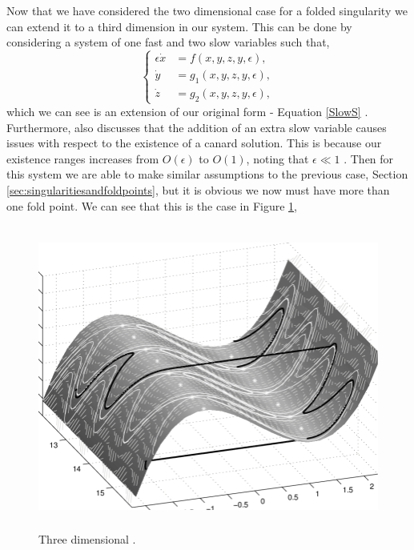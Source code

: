 Now that we have considered the two dimensional case for a folded singularity we can extend it to a third dimension in our system. This can be done by considering a system of one fast and two slow variables such that, 
\begin{equation}
\begin{cases}
\epsilon \dot{x}&=f(x,y,z,y,\epsilon),\\
\dot{y}&=g_1(x,y,z,y,\epsilon),\\
\dot{z}&=g_2(x,y,z,y,\epsilon),
\end{cases}\label{eq: fs singularity system}
\end{equation}
which we can see is an extension of our original form - Equation \ref{SlowS} \citep{MMO}. Furthermore, \citet{MMO} also discusses that the addition of an extra slow variable causes issues with respect to the existence of a canard solution. This is because our existence ranges increases from $ O(\epsilon) $ to $ O(1) $, noting that $ \epsilon\ll 1 $ \citep{MMO}. Then for this system we are able to make similar assumptions to the previous case, Section \ref{sec:singularitiesandfoldpoints}, but it is obvious we now must have more than one fold point. We can see that this is the case in Figure \ref{fig: 3d folded singularity},
\begin{figure}[h!]\centering
	\includegraphics[height=10cm,width=14cm]{Images/Three-dimensional-plot-of-a-trajectory-for-the-van-der-Pol-equation-and-the-critical}
	\caption{Three dimensional \vdp \citep{3D-VdP}.}
	\label{fig: 3d folded singularity}
\end{figure}\newpage
